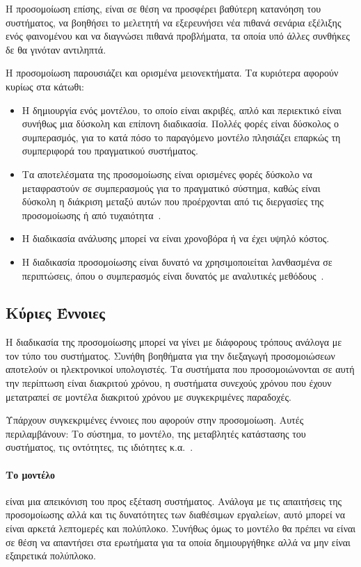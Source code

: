 \documentclass[12pt]{report}
\begin{document}
Η προσομοίωση επίσης, είναι σε θέση να προσφέρει βαθύτερη κατανόηση του συστήματος, να βοηθήσει το μελετητή να εξερευνήσει νέα πιθανά σενάρια εξέλιξης ενός φαινομένου και να διαγνώσει πιθανά προβλήματα, τα οποία υπό άλλες συνθήκες δε θα γινόταν αντιληπτά.

Η προσομοίωση παρουσιάζει και ορισμένα μειονεκτήματα. Τα κυριότερα αφορούν κυρίως στα κάτωθι:

\begin{itemize}
  \item Η δημιουργία ενός μοντέλου, το οποίο είναι ακριβές, απλό και περιεκτικό είναι συνήθως μια δύσκολη και επίπονη διαδικασία. Πολλές φορές είναι δύσκολος ο συμπερασμός, για το κατά πόσο το παραγόμενο μοντέλο πλησιάζει επαρκώς τη συμπεριφορά του πραγματικού συστήματος.
  \item Τα αποτελέσματα της προσομοίωσης είναι ορισμένες φορές δύσκολο να μεταφραστούν σε συμπερασμούς για το πραγματικό σύστημα, καθώς είναι δύσκολη η διάκριση μεταξύ αυτών που προέρχονται από τις διεργασίες της προσομοίωσης ή από τυχαιότητα~\cite{book:04}.
  \item Η διαδικασία ανάλυσης μπορεί να είναι χρονοβόρα ή να έχει υψηλό κόστος.
  \item Η διαδικασία προσομοίωσης είναι δυνατό να χρησιμοποιείται λανθασμένα σε περιπτώσεις, όπου ο συμπερασμός είναι δυνατός με αναλυτικές μεθόδους~\cite{book:04}.
\end{itemize}

\subsection{Κύριες Έννοιες}
Η διαδικασία της προσομοίωσης μπορεί να γίνει με διάφορους τρόπους ανάλογα με τον τύπο του συστήματος. Συνήθη βοηθήματα για την διεξαγωγή προσομοιώσεων αποτελούν οι ηλεκτρονικοί υπολογιστές. Τα συστήματα που προσομοιώνονται σε αυτή την περίπτωση είναι διακριτού χρόνου, η συστήματα συνεχούς χρόνου που έχουν μετατραπεί σε μοντέλα διακριτού χρόνου με συγκεκριμένες παραδοχές.

Υπάρχουν συγκεκριμένες έννοιες που αφορούν στην προσομοίωση. Αυτές περιλαμβάνουν: Το σύστημα, το μοντέλο, της μεταβλητές κατάστασης του συστήματος, τις οντότητες, τις ιδιότητες κ.α.~\cite{book:04}.

\paragraph{Το μοντέλο} είναι μια απεικόνιση του προς εξέταση συστήματος. Ανάλογα με τις απαιτήσεις της προσομοίωσης αλλά και τις δυνατότητες των διαθέσιμων εργαλείων, αυτό μπορεί να είναι αρκετά λεπτομερές και πολύπλοκο. Συνήθως όμως το μοντέλο θα πρέπει να είναι σε θέση να απαντήσει στα ερωτήματα για τα οποία δημιουργήθηκε αλλά να μην είναι εξαιρετικά πολύπλοκο.
\end{document}
